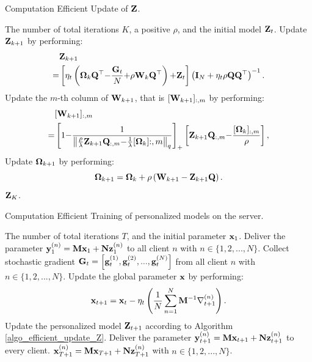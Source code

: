 \documentclass[journal]{IEEEtran}
\newcommand\algotext[1]{\end{algorithmic}#1\begin{algorithmic}[1]}
\begin{document}
\begin{algorithm}[!]
    \caption{Computation Efficient Update of ${\bf Z}$.}
    \label{algo_efficient_update_Z}
    \begin{algorithmic}[1]
        \Require The number of total iterations $K$, a positive $\rho$, and the initial model ${\bf Z}_t$.
            \State Update ${\bf Z}_{k+1}$ by performing:
            \begin{align}
            \nonumber
            & {\bf Z}_{k+1} \\ \nonumber
            = & \left [ \eta_t\left( \boldsymbol{\Omega}_k{\bf Q}^\top\mathrm{-}\frac{{\bf G}_t}{N}\mathrm{+}\rho{\bf W}_k{\bf Q}^\top \right)\mathrm{+}{\bf Z}_t \right ]\left( {\bf I}_N+\eta_t\rho{\bf Q}{\bf Q}^\top \right)^{-1}.
            \end{align}
            \State Update the $m$-th column of ${\bf W}_{k+1}$, that is $[{\bf W}_{k+1}]_{:,m}$ by performing:
            \begin{align}
	   \nonumber
	   & [{\bf W}_{k+1}]_{:,m} \\ \nonumber
	   \mathrm{=}& \left [1\mathrm{-} \frac{1}{\left\lVert\frac{\rho}{\lambda} 		          {\bf Z}_{k+1}{\bf Q}_{:, m} \mathrm{-} \frac{1}{\lambda}[\boldsymbol{\Omega}_k]{:, m}\right\rVert_q}\right]_\mathrm{+} \left[ {\bf Z}_{k+1}{\bf Q}_{:, m} \mathrm{-} \frac{[\boldsymbol{\Omega}_k]_{:, m}}{\rho}\right],
	\end{align} 
           \State Update $\boldsymbol{\Omega}_{k+1}$ by performing:
            $$\boldsymbol{\Omega}_{k+1}  = \boldsymbol{\Omega}_k + \rho \left( {\bf W}_{k+1} - {\bf Z}_{k+1}{\bf Q} \right).$$
            \State \EndFor
        \Return ${\bf Z}_K$.
      \end{algorithmic}
\end{algorithm}

\begin{algorithm}[!]
    \caption{Computation Efficient Training of personalized models on the server.}
    \label{algo_xxx}
    \begin{algorithmic}[1]
        \Require The number of total iterations $T$, and the initial parameter ${\bf x}_1$.
        \State Deliver the parameter ${\bf y}_1^{(n)} = {\bf M}{\bf x}_1 + {\bf N}{\bf z}_1^{(n)}$ to all client $n$ with $n\in\{1,2, ..., N\}$.
            \State Collect stochastic gradient ${\bf G}_t = \left [ {\bf g}_t^{(1)}, {\bf g}_t^{(2)}, ..., {\bf g}_t^{(N)} \right ]$ from all client $n$ with $n\in\{1,2, ..., N\}$.
            \State Update the global parameter ${\bf x}$ by performing:
            $$ {\bf x}_{t+1} = {\bf x}_t - \eta_t \left( \frac{1}{N}\sum_{n=1}^N{\bf M}^{-1}\nabla_{t+1}^{(n)} \right). $$
           \State Update the personalized model ${\bf Z}_{t+1}$ according to Algorithm \ref{algo_efficient_update_Z}.
            \State Deliver the parameter ${\bf y}_{t+1}^{(n)} = {\bf M}{\bf x}_{t+1} + {\bf N}{\bf z}_{t+1}^{(n)}$ to every client.
        \EndFor
        \Return ${\bf x}_{T+1}^{(n)} = {\bf M}{\bf x}_{T+1} + {\bf N}{\bf z}_{T+1}^{(n)}$ with $n\in\{1,2, ..., N\}$.
      \end{algorithmic}
\end{algorithm} 
\end{document}
